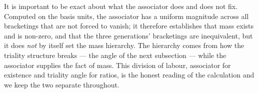 It is important to be exact about what the associator does and does not fix. Computed on the basis
units, the associator has a uniform magnitude across all bracketings that are not forced to vanish;
it therefore establishes that mass exists and is non-zero, and that the three generations'
bracketings are inequivalent, but it does \emph{not} by itself set the mass hierarchy. The hierarchy
comes from how the triality structure breaks --- the angle of the next subsection --- while the
associator supplies the fact of mass. This division of labour, associator for existence and triality
angle for ratios, is the honest reading of the calculation and we keep the two separate throughout.
